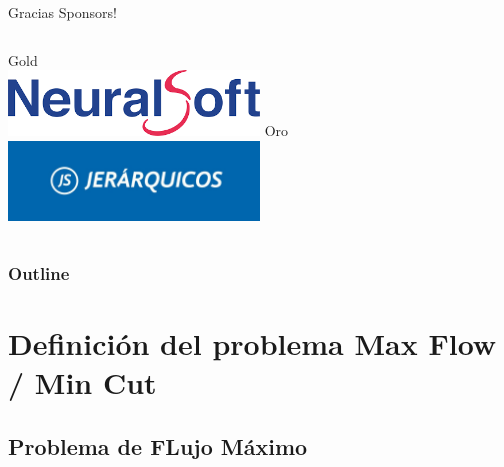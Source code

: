 \documentclass{beamer}
\begin{document}

\begin{frame}{Gracias Sponsors!}
    \begin{columns}[t]
        \centering
        Gold\\
        \includegraphics[width=0.5\textwidth,keepaspectratio]{logos/neuralsoft.png}
        \centering
        Oro\\
        \includegraphics[width=0.5\textwidth,keepaspectratio]{logos/jerarquicos.jpg}
    \end{columns}
\end{frame}

\begin{frame}
\frametitle{Outline}
\tableofcontents
\end{frame}


\section{Definición del problema Max Flow / Min Cut}
    \subsection{Problema de FLujo Máximo}
\end{document}
